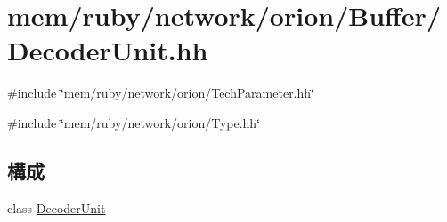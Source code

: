 \hypertarget{DecoderUnit_8hh}{
\section{mem/ruby/network/orion/Buffer/DecoderUnit.hh}
\label{DecoderUnit_8hh}
}
{\ttfamily \#include \char`\"{}mem/ruby/network/orion/TechParameter.hh\char`\"{}}\par
{\ttfamily \#include \char`\"{}mem/ruby/network/orion/Type.hh\char`\"{}}\par
\subsection*{構成}
\begin{DoxyCompactItemize}
\item 
class \hyperlink{classDecoderUnit}{DecoderUnit}
\end{DoxyCompactItemize}

